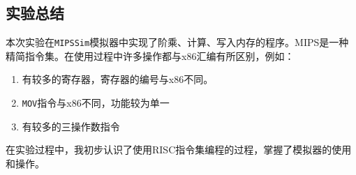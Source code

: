 \documentclass[a4paper,twoside]{article}
\begin{document}
\begin{spacing}{1.2}
\section{实验总结}

本次实验在\texttt{MIPSSim}模拟器中实现了阶乘、计算、写入内存的程序。MIPS是一种
精简指令集。在使用过程中许多操作都与x86汇编有所区别，例如：
\begin{enumerate}
	\item 有较多的寄存器，寄存器的编号与x86不同。
	\item \texttt{MOV}指令与x86不同，功能较为单一
	\item 有较多的三操作数指令
\end{enumerate}
在实验过程中，我初步认识了使用RISC指令集编程的过程，掌握了模拟器的使用和操作。

\end{spacing}
\end{document}
